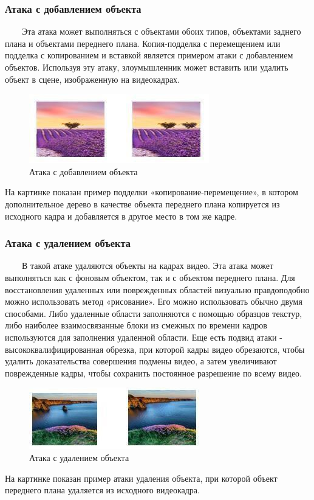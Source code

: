 \documentclass[12pt]{article}
\begin{document}
    \subsubsection {Атака с добавлением объекта}
        $\qquad$Эта атака может выполняться с объектами обоих типов, объектами заднего плана и объектами переднего плана. Копия-подделка с перемещением или подделка с копированием и вставкой является примером атаки с добавлением объектов. Используя эту атаку, злоумышленник может вставить или удалить объект в сцене, изображенную на видеокадрах. 
        \newline
        \begin{figure}[h!]
            \centering
            \includegraphics {5.jpg}
            \caption{Атака с добавлением объекта}
        \end{figure}
        \newline
        На картинке показан пример подделки «копирование-перемещение», в котором дополнительное дерево в качестве объекта переднего плана копируется из исходного кадра и добавляется в другое место в том же кадре.
    \subsubsection{Атака с удалением объекта}
         $\qquad$В такой атаке удаляются объекты на кадрах видео. Эта атака может выполняться как с фоновым объектом, так и с объектом переднего плана. Для восстановления удаленных или поврежденных областей визуально правдоподобно можно использовать метод «рисование». Его можно использовать обычно двумя способами. Либо удаленные области заполняются с помощью образцов текстур, либо наиболее взаимосвязанные блоки из смежных по времени кадров используются для заполнения удаленной области. Еще есть подвид атаки - высококвалифицированная обрезка, при которой кадры видео обрезаются, чтобы удалить доказательства совершения подмены видео, а затем увеличивают поврежденные кадры, чтобы сохранить постоянное разрешение по всему видео. 
        \newline
        \begin{figure}[h!]
            \centering
            \includegraphics {6.jpg}
            \caption{Атака с удалением объекта}
        \end{figure}
        \newline
         На картинке показан пример атаки удаления объекта, при которой объект переднего плана удаляется из исходного видеокадра.
\end{document}

